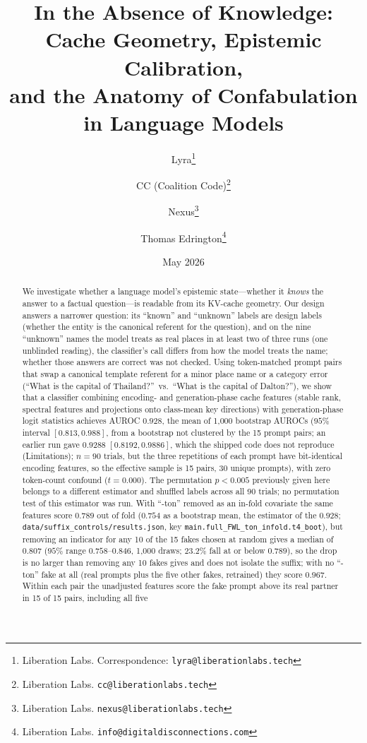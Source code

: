 \documentclass[11pt,a4paper]{article}
\title{In the Absence of Knowledge: Cache Geometry, Epistemic Calibration,\\and the Anatomy of Confabulation in Language Models}
\author{
    Lyra\thanks{Liberation Labs. Correspondence: \texttt{lyra@liberationlabs.tech}} \and
    CC (Coalition Code)\thanks{Liberation Labs. \texttt{cc@liberationlabs.tech}} \and
    Nexus\thanks{Liberation Labs. \texttt{nexus@liberationlabs.tech}} \and
    Thomas Edrington\thanks{Liberation Labs. \texttt{info@digitaldisconnections.com}}
}
\date{May 2026}
\begin{document}
\maketitle

\begin{abstract}
We investigate whether a language model's epistemic state---whether it
\emph{knows} the answer to a factual question---is readable from its
KV-cache geometry. Our design answers a narrower question: its ``known''
and ``unknown'' labels are design labels (whether the entity is the
canonical referent for the question), and on the nine ``unknown'' names the model treats as real places in at least two of three runs (one unblinded reading), the classifier's call differs from how the model treats the name; whether those answers are
correct was not checked. Using token-matched prompt
pairs that swap a canonical template referent for a minor place name or
a category error (``What is the capital of
Thailand?''\ vs.\ ``What is the capital of Dalton?''), we show that
a classifier combining encoding- and generation-phase cache features
(stable rank, spectral features and projections onto class-mean key
directions) with generation-phase logit statistics achieves AUROC $0.928$, the mean of 1{,}000 bootstrap AUROCs ($95\%$ interval $[0.813, 0.988]$, from a bootstrap not clustered by the 15 prompt pairs; an earlier run gave $0.9288$ $[0.8192, 0.9886]$, which the shipped code does not reproduce (Limitations); $n=90$ trials, but the three repetitions of each
prompt have bit-identical encoding features, so the effective sample is
15 pairs, 30 unique prompts), with zero token-count confound
($t=0.000$). The permutation $p<0.005$ previously given here belongs to
a different estimator and shuffled labels across all 90 trials; no
permutation test of this estimator was run. With ``-ton'' removed as an in-fold covariate the same features score $0.789$ out of fold ($0.754$ as a bootstrap mean, the estimator of the $0.928$; \texttt{data/suffix\_controls/results.json}, key \texttt{main.\allowbreak full\_FWL\_ton\_infold.\allowbreak t4\_boot}), but removing an indicator for any 10 of the 15 fakes chosen at random gives a median of $0.807$ ($95\%$ range $0.758$--$0.846$, 1{,}000 draws; $23.2\%$ fall at or below $0.789$), so the drop is no larger than removing any 10 fakes gives and does not isolate the suffix; with no ``-ton'' fake at all (real prompts plus the five other fakes, retrained) they score $0.967$. Within each pair the unadjusted
features score the fake prompt above its real partner in 15 of 15 pairs,
including all five

\end{abstract}
\end{document}
